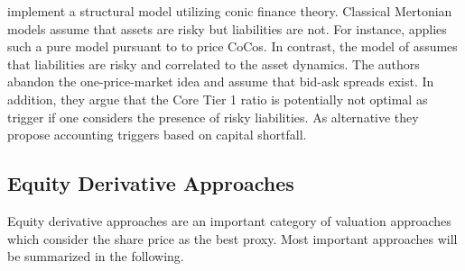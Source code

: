 \citet{madan2011conic} implement a structural model utilizing conic finance theory. Classical Mertonian models \citep{merton1974pricing} assume that assets are risky but liabilities are not. For instance, \citet{alvemar2012modelling} applies such a pure model pursuant to \citet{merton1974pricing} to price CoCos. In contrast, the model of \citet{madan2011conic} assumes that liabilities are risky and correlated to the asset dynamics. The authors abandon the one-price-market idea and assume that bid-ask spreads exist. In addition, they argue that the Core Tier 1 ratio is potentially not optimal as trigger if one considers the presence of risky liabilities. As alternative they propose accounting triggers based on capital shortfall.



\subsection*{Equity Derivative Approaches}
Equity derivative approaches are an important category of valuation approaches which consider the share price as the best proxy. Most important approaches will be summarized in the following.\\

